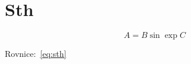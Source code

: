 \documentclass{protokol}
\begin{document}
    \section*{Sth}

    \begin{equation} 
      \label{eq:sth}
      A = B \sin \exp C
    \end{equation}

    Rovnice:~\eqref{eq:sth}

    
    
  
\end{document}
